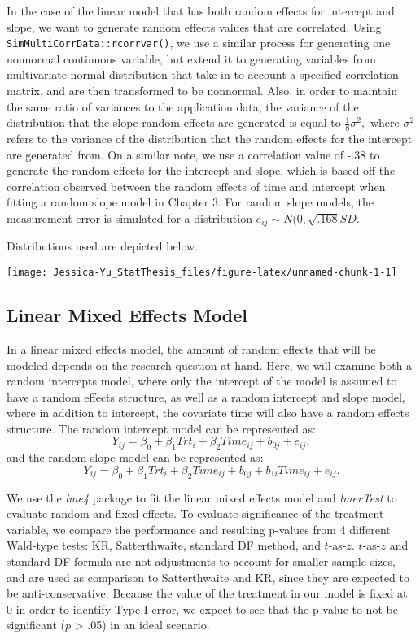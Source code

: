 \documentclass[12pt, twoside]{amherstthesis}
\begin{document}
In the case of the linear model that has both random effects for intercept and slope, we want to generate random effects values that are correlated. Using \texttt{SimMultiCorrData::rcorrvar()}, we use a similar process for generating one nonnormal continuous variable, but extend it to generating variables from multivariate normal distribution that take in to account a specified correlation matrix, and are then transformed to be nonnormal. Also, in order to maintain the same ratio of variances to the application data, the variance of the distribution that the slope random effects are generated is equal to \(\frac{1}{8}\sigma^2,\) where \(\sigma^2\) refers to the variance of the distribution that the random effects for the intercept are generated from. On a similar note, we use a correlation value of -.38 to generate the random effects for the intercept and slope, which is based off the correlation observed between the random effects of time and intercept when fitting a random slope model in Chapter 3. For random slope models, the measurement error is simulated for a distribution \(e_{ij}\sim\mathit{N}(0,\sqrt{.168}SD.\)

Distributions used are depicted below.
\begin{center}\texttt{[image: Jessica-Yu\_StatThesis\_files/figure-latex/unnamed-chunk-1-1]} \end{center}

\hypertarget{linear-mixed-effects-model}{%
\subsection{Linear Mixed Effects Model}\label{linear-mixed-effects-model}}

In a linear mixed effects model, the amount of random effects that will be modeled depends on the research question at hand. Here, we will examine both a random intercepts model, where only the intercept of the model is assumed to have a random effects structure, as well as a random intercept and slope model, where in addition to intercept, the covariate time will also have a random effects structure. The random intercept model can be represented as: \[Y_{ij} = \beta_0 + \beta_1Trt_i + \beta_2Time_{ij} + b_{0j} + e_{ij},\] and the random slope model can be represented as: \[Y_{ij} = \beta_0 + \beta_1Trt_i + \beta_2Time_{ij} + b_{0j} + b_{1i}Time_{ij} + e_{ij}.\]

We use the \emph{lme4} package to fit the linear mixed effects model and \emph{lmerTest} to evaluate random and fixed effects. To evaluate significance of the treatment variable, we compare the performance and resulting p-values from 4 different Wald-type tests: KR, Satterthwaite, standard DF method, and \(t\)-as-\(z\). \(t\)-as-\(z\) and standard DF formula are not adjustments to account for smaller sample sizes, and are used as comparison to Satterthwaite and KR, since they are expected to be anti-conservative. Because the value of the treatment in our model is fixed at 0 in order to identify Type I error, we expect to see that the p-value to not be significant (\(p\) \textgreater{} .05) in an ideal scenario.
\end{document}
